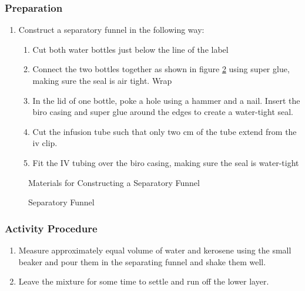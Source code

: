 \subsubsection*{Preparation}
\begin{enumerate}
\item{Construct a separatory funnel in the following way:}
\begin{enumerate}
\item{Cut both water bottles just below the line of the label}
\item{Connect the two bottles together as shown in figure \ref{fig:sep-funnel} using super glue, making sure the seal is air tight. Wrap}
\item{In the lid of one bottle, poke a hole using a hammer and a nail. Insert the biro casing and super glue around the edges to create a water-tight seal.}
\item{Cut the infusion tube such that only two cm of the tube extend from the iv clip.}
\item{Fit the IV tubing over the biro casing, making sure the seal is water-tight}
\end{enumerate}
\end{enumerate}

\begin{figure}[h]
\begin{center}
\def\svgwidth{250pt}

\caption{Materials for Constructing a Separatory Funnel}
\label{fig:separating-funnel_materials}
\end{center}
\end{figure}

\begin{figure}[h]
\begin{center}
\def\svgwidth{50pt}

\caption{Separatory Funnel}
\label{fig:sep-funnel}
\end{center}
\end{figure}

\subsubsection*{Activity Procedure}
\begin{enumerate}
\item{Measure approximately equal volume of water and kerosene using the small beaker and pour them in the separating funnel and shake them well.}
\item{Leave the mixture for some time to settle and run off the lower layer.}
\end{enumerate}

